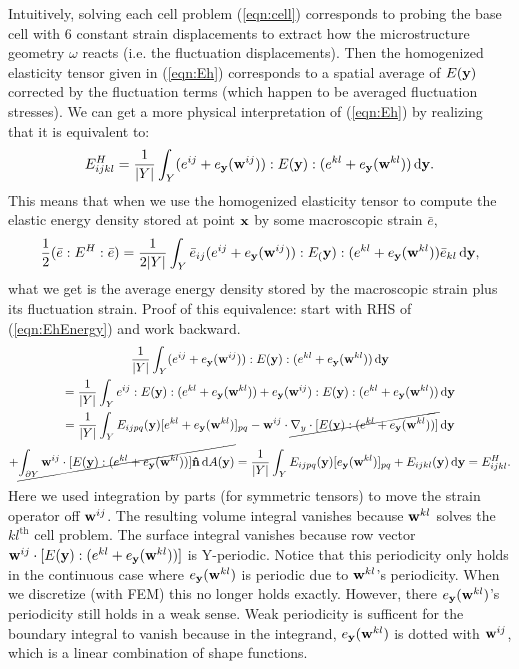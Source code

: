 \documentclass[10pt]{article}
\begin{document}
Intuitively, solving each cell problem (\ref{eqn:cell}) corresponds to probing
the base cell with 6 constant strain displacements to extract how the
microstructure geometry $\omega$ reacts (i.e. the fluctuation displacements).
Then the homogenized elasticity tensor given in (\ref{eqn:Eh}) corresponds to a
spatial average of $E({\bf y})$ corrected by the fluctuation terms (which
happen to be averaged fluctuation stresses). We can get a more physical
interpretation of (\ref{eqn:Eh}) by realizing that it is equivalent to:
\begin{equation}
    \label{eqn:EhEnergy}
    E^H_{ijkl} = \frac{1}{|Y|} \int_Y (e^{ij} + e_{\bf y}({\bf w}^{ij})) : E({\bf y}) : (e^{kl} + e_{\bf y}({\bf w}^{kl})) \, \mathrm{d} {\bf y}.
\end{equation}
This means that when we use the homogenized elasticity tensor to compute the
elastic energy density stored at point ${\bf x}$ by some macroscopic strain
$\bar{e}$,
$$
\frac{1}{2} (\bar{e} : E^H :\bar{e}) =
\frac{1}{2|Y|} \int_Y \bar{e}_{ij} (e^{ij} + e_{\bf y}({\bf w}^{ij})) : E_({\bf y}) : (e^{kl} + e_{\bf y}({\bf w}^{kl})) \bar{e}_{kl} \, \mathrm{d} {\bf y},
$$
what we get is the average energy density stored by the macroscopic strain plus
its fluctuation strain. Proof of this equivalence: start with RHS of
(\ref{eqn:EhEnergy}) and work backward.
\begin{gather*}
\frac{1}{|Y|} \int_Y (e^{ij} + e_{\bf y}({\bf w}^{ij})) : E({\bf y}) : (e^{kl} + e_{\bf y}({\bf w}^{kl})) \, \mathrm{d} {\bf y} \\
= \frac{1}{|Y|} \int_Y e^{ij} : E({\bf y}) : (e^{kl} + e_{\bf y}({\bf w}^{kl})) +
    e_{\bf y}({\bf w}^{ij}) : E({\bf y}) : (e^{kl} + e_{\bf y}({\bf w}^{kl})) \, \mathrm{d} {\bf y} \\
    = \frac{1}{|Y|} \int_Y E_{ijpq}({\bf y}) [e^{kl} + e_{\bf y}({\bf w}^{kl})]_{pq} -
{{\bf w}}^{ij} \cdot \cancel{\nabla_y \cdot [E({\bf y}) : (e^{kl} + e_{\bf y}({\bf w}^{kl}))]} \, \mathrm{d} {\bf y} \\
+ \cancel{\int_{\partial Y} {\bf w}^{ij} \cdot [E({\bf y}) : (e^{kl} + e_{\bf y}({\bf w}^{kl}))] {\bf \hat{n}} \, \mathrm{d} A({\bf y})}
= \frac{1}{|Y|} \int_Y E_{ijpq}({\bf y}) [e_{\bf y}({\bf w}^{kl})]_{pq} + E_{ijkl}({\bf y}) \, \mathrm{d} {\bf y} = E^H_{ijkl}.
\end{gather*}
Here we used integration by parts (for symmetric tensors) to move the strain
operator off ${\bf w}^{ij}$. The resulting volume integral vanishes because ${\bf
w}^{kl}$ solves the $kl^\text{th}$ cell problem. The surface integral vanishes
because row vector ${\bf w}^{ij} \cdot [E({\bf y}) : (e^{kl} + e_{\bf
y}({\bf w}^{kl}))]$ is Y-periodic. Notice that this periodicity only holds
in the continuous case where $e_{\bf y}({\bf w}^{kl})$ is periodic due to ${\bf
w}^{kl}$'s
periodicity. When we discretize (with FEM) this no longer holds exactly.
However, there $e_{\bf y}({\bf w}^{kl})$'s periodicity still holds in a weak sense.
Weak periodicity is sufficent for the boundary integral to vanish because in the
integrand, $e_{\bf y}({\bf w}^{kl})$ is dotted with ${\bf w}^{ij}$, which is a linear
combination of shape functions.
\end{document}
